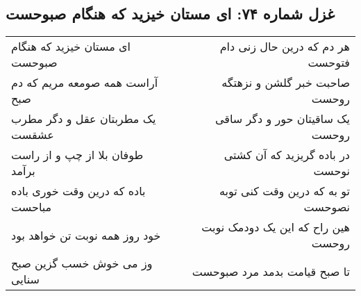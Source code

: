\begin{center}
\section*{غزل شماره ۷۴: ای مستان خیزید که هنگام صبوحست}
\label{sec:074}
\begin{longtable}{l p{0.5cm} r}
ای مستان خیزید که هنگام صبوحست
&&
هر دم که درین حال زنی دام فتوحست
\\
آراست همه صومعه مریم که دم صبح
&&
صاحبت خبر گلشن و نزهتگه روحست
\\
یک مطربتان عقل و دگر مطرب عشقست
&&
یک ساقیتان حور و دگر ساقی روحست
\\
طوفان بلا از چپ و از راست برآمد
&&
در باده گریزید که آن کشتی نوحست
\\
باده که درین وقت خوری باده مباحست
&&
تو به که درین وقت کنی توبه نصوحست
\\
خود روز همه نوبت تن خواهد بود
&&
هین راح که این یک دودمک نوبت روحست
\\
وز می خوش خسب گزین صبح سنایی
&&
تا صبح قیامت بدمد مرد صبوحست
\\
\end{longtable}
\end{center}
